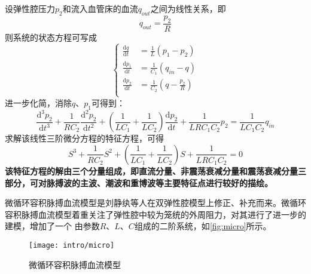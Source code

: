 设弹性腔压力$p_{2}$和流入血管床的血流$q_{out}$之间为线性关系，即
\begin{equation}
    \label{equ:pq}
    q_{out}=\frac{p_{2}}{R}
\end{equation}
则系统的状态方程可写成
\begin{equation}
    \left \{
    \begin{aligned}
        \frac{\mathrm{d} q}{\mathrm{d} t} &= \frac{1}{L}(p_{1}-p_{2}) \\
        \frac{\mathrm{d} p_{1}}{\mathrm{d} t} &= \frac{1}{C_{1}}(q_{in}-q) \\
        \frac{\mathrm{d} p_{2}}{\mathrm{d} t} &= \frac{1}{C_{2}}(q-\frac{p_{2}}{R}) \\
    \end{aligned}
    \right.
\end{equation}
进一步化简，消除$q$、$p_{1}$可得到：
\begin{equation}
    \label{equ:diff}
    \frac{\mathrm{d^3} p_{2}}{\mathrm{d} t^3}+\frac{1}{RC_{2}}\frac{\mathrm{d}^2p_{2} }{\mathrm{d} t^2}+
    (\frac{1}{LC_{1}}+\frac{1}{LC_{2}})\frac{\mathrm{d} p_{2}}{\mathrm{d} t}+\frac{1}{LRC_{1}C_{2}}p_{2}
    =\frac{1}{LC_{1}C_{2}}q_{in}
\end{equation}
求解该线性三阶微分方程的特征方程，可得
\begin{equation}
    \label{equ:character}
    S^3+\frac{1}{RC_{2}}S^2+(\frac{1}{LC_{1}}+\frac{1}{LC_{2}})S+\frac{1}{LRC_{1}C_{2}}=0
\end{equation}
\textbf{该特征方程的解由三个分量组成，即直流分量、非震荡衰减分量和震荡衰减分量三部分，可对脉搏波的主波、潮波和重博波等主要特征点进行较好的描绘。}

微循环容积脉搏血流模型是刘静纨等人\cite{Liu2001}在双弹性腔模型上修正、补充而来。微循环容积脉搏血流模型着重关注了弹性腔中较为笼统的外周阻力，对其进行了进一步的建模，增加了一个
由参数$R$、$L$、$C$组成的二阶系统，如\autoref{fig:micro}所示。
\begin{figure}[htbp]
    \centering
    \texttt{[image: intro/micro]}
    \caption[微循环容积脉搏血流模型]{\label{fig:micro}微循环容积脉搏血流模型\cite{PPGYY}}
\end{figure}

